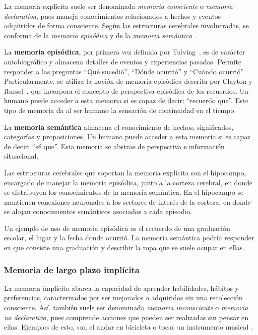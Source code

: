 La memoria explícita suele ser denominada \textit{memoria consciente} o \textit{memoria declarativa}, pues maneja conocimientos relacionados a hechos y eventos adquiridos de forma consciente. Según las estructuras cerebrales involucradas, se conforma de la \textit{memoria episódica} y de la \textit{memoria semántica}~\cite{Eichenbaum:2008}.

La \textbf{memoria episódica}, por primera vez definida por Tulving~\cite{2_tulving}, es de carácter  autobiográfico y almacena detalles de eventos y experiencias pasadas. Permite responder a las preguntas ``Qué sucedió'', ``Dónde ocurrió'' y ``Cuándo ocurrió''~\cite{Deutsch2008}. Particularmente, se utiliza la noción de memoria episódica descrita por Clayton y Russel~\cite{CLAYTON20092330}, que incorpora el concepto de perspectiva episódica de los recuerdos. Un humano puede acceder a esta memoria si es capaz de decir: ``recuerdo que''. Este tipo de memoria da al ser humano la sensación de continuidad en el tiempo.

La \textbf{memoria semántica} almacena el conocimiento de hechos, significados, categorías y proposiciones. Un humano puede acceder a esta memoria si es capaz de decir: ``sé que''. Esta memoria se abstrae de perspectiva e información situacional.

Las estructuras cerebrales que soportan la memoria explícita son el hipocampo, encargado de manejar la memoria episódica, junto a la corteza cerebral, en donde se distribuyen los conocimientos de la memoria semántica. En el hipocampo se mantienen conexiones neuronales a los sectores de interés de la corteza, en donde se alojan conocimientos semánticos asociados a cada episodio.

Un ejemplo de uso de memoria episódica es el recuerdo de una graduación escolar, el lugar y la fecha donde ocurrió. La memoria semántica podría responder en que consiste una graduación y describir la ropa que se suele ocupar en ellas.



\subsubsection{Memoria de largo plazo implícita}

La memoria implícita abarca la capacidad de aprender habilidades, hábitos y preferencias, caracterizados por ser mejorados o adquiridos sin una recolección consciente. Así, también suele ser denominada \textit{memoria inconsciente} o \textit{memoria no declarativa}, pues comprende acciones que pueden ser realizadas sin pensar en ellas. Ejemplos de esto, son el andar en bicicleta o tocar un instrumento musical~\cite{Eichenbaum:2008}.

